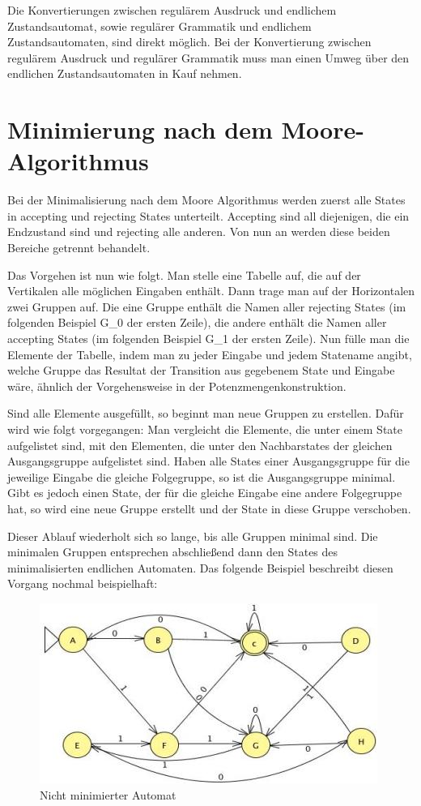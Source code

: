 Die Konvertierungen zwischen regul\"arem Ausdruck und endlichem Zustandsautomat, sowie regul\"arer Grammatik und endlichem Zustandsautomaten, sind direkt m\"oglich. Bei der Konvertierung zwischen regul\"arem Ausdruck und regul\"arer Grammatik muss man einen Umweg \"uber den endlichen Zustandsautomaten in  Kauf nehmen.

\section{Minimierung nach dem Moore-Algorithmus}

Bei der Minimalisierung nach dem Moore Algorithmus werden zuerst alle States in accepting und rejecting States unterteilt. Accepting sind all diejenigen, die ein Endzustand sind und rejecting alle anderen. Von nun  an werden diese beiden Bereiche getrennt behandelt.

Das Vorgehen ist nun wie folgt. Man stelle eine Tabelle auf, die auf der Vertikalen alle m\"oglichen Eingaben enth\"alt. Dann trage man auf der Horizontalen zwei Gruppen auf. Die eine Gruppe enth\"alt die Namen aller rejecting States (im folgenden Beispiel G\_0 der ersten Zeile), die andere enthält die Namen aller accepting States (im folgenden Beispiel G\_1 der ersten Zeile). Nun f\"ulle man die Elemente der Tabelle, indem man zu jeder Eingabe und jedem Statename angibt, welche Gruppe das Resultat der Transition aus gegebenem State und Eingabe w\"are, \"ahnlich der Vorgehensweise in der Potenzmengenkonstruktion.
 
Sind alle Elemente ausgef\"ullt, so beginnt man neue Gruppen zu erstellen. Daf\"ur wird wie folgt vorgegangen: Man vergleicht die Elemente, die unter einem State aufgelistet sind, mit den Elementen, die unter den Nachbarstates der gleichen Ausgangsgruppe aufgelistet sind. Haben alle States einer Ausgangsgruppe f\"ur die jeweilige Eingabe die gleiche Folgegruppe, so ist die Ausgangsgruppe minimal. Gibt es jedoch einen State, der f\"ur die gleiche Eingabe eine andere Folgegruppe hat, so wird eine neue Gruppe erstellt und der State in diese Gruppe verschoben.

Dieser Ablauf wiederholt sich so lange, bis alle Gruppen minimal sind. Die minimalen Gruppen entsprechen abschließend dann den States des minimalisierten endlichen Automaten. Das folgende Beispiel beschreibt diesen Vorgang nochmal beispielhaft:

\begin{figure}[h]
 \centering
 \includegraphics[keepaspectratio, scale=0.75]{objectsToInclude/Moore_nichtminimal.jpg}
 \caption{Nicht minimierter Automat}
\label{fig:FSA_Moore_notminimal}
\end{figure}

